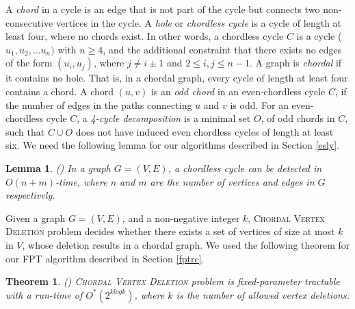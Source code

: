 \documentclass[review, 1p]{elsarticle}
\newtheorem{theorem}{Theorem}
\newtheorem{lemma}{Lemma}
\begin{document}
A \textit{chord} in a  cycle is an edge that is not part of the cycle but connects  two non-consecutive vertices in the cycle. A \textit{hole} or \textit{chordless cycle} is a cycle of length at least four, where no chords exist. In other words, a chordless cycle $C$ is a cycle ($u_{1},u_{2}, \ldots u_{n})$ with $n \geq 4$, and the additional constraint that there exists no edges of the form $(u_{i},u_{j})$, where $j\neq i\pm 1$ and $2 \leq i,j \leq n-1$. A graph is \textit{chordal} if it contains no hole. That is, in a chordal graph, every cycle of length at least four contains a chord. A chord $(u,v)$ is an \textit{odd chord} in an even-chordless cycle $C$, if the number of edges in the paths connecting $u$ and $v$ is odd. For an even-chordless cycle $C$, a \textit{4-cycle decomposition} \label{4-cycle} is a minimal set $O$, of odd chords in $C$, such that $C \cup O$ does not have induced even chordless cycles of length at least six. We need the following lemma for our algorithms described in Section \ref{esly}.   \begin{lemma}\label{prop6}\textup{(\cite[Theorem 2] {uno2014efficient})} In a graph $G=(V,E)$, a chordless cycle can be detected in $O(n + m)$-time, where $n$ and $m$ are the number of vertices and edges in $G$ respectively.\end{lemma}
 \noindent Given a graph $G=(V,E)$, and a non-negative integer $k$, \textsc{Chordal Vertex Deletion} problem decides whether there exists a set of vertices of size at most $k$ in $V$, whose deletion results in a chordal graph. We used the following theorem for our FPT \label{chrdldef} algorithm described in Section \ref{fptrc}.
\begin{theorem}\textup{(\cite[Theorem 1.1] {cao2016chordal})} \label{thmchrdl}
\textsc{Chordal Vertex Deletion} problem is fixed-parameter tractable with a run-time of $O^{*}(2^{klogk})$, where $k$ is the number of allowed vertex deletions.
\end{theorem}
\end{document}
